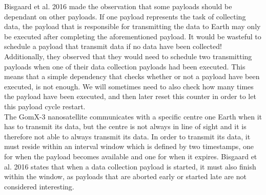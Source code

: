 Bisgaard et al. 2016\cite{gomx3} made the observation that some payloads should be dependant on other payloads. If one payload represents the task of collecting data, the payload that is responsible for transmitting the data to Earth may only be executed after completing the aforementioned payload. It would be wasteful to schedule a payload that transmit data if no data have been collected! Additionally, they observed that they would need to schedule two transmitting payloads when one of their data collection payloads had been executed. This means that a simple dependency that checks whether or not a payload have been executed, is not enough. We will sometimes need to also check how many times the payload have been executed, and then later reset this counter in order to let this payload cycle restart.\\
The GomX-3 nanosatellite communicates with a specific centre one Earth when it has to transmit its data, but the centre is not always in line of sight and it is therefore not able to always transmit its data. In order to transmit its data, it must reside within an interval window which is defined by two timestamps, one for when the payload becomes available and one for when it expires. Bisgaard et al. 2016\cite{gomx3} states that when a data collection payload is started, it must also finish within the window, as payloads that are aborted early or started late are not considered interesting.
